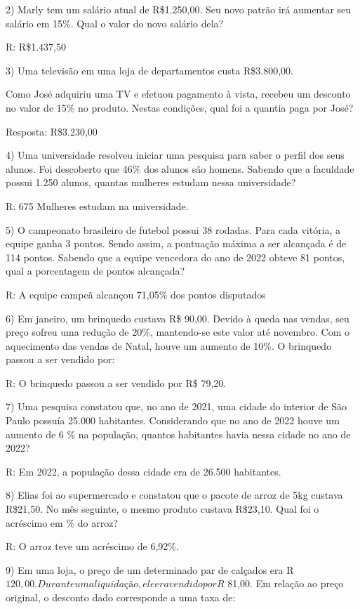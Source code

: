 2) Marly tem um salário atual de R\$1.250,00. Seu novo patrão irá
aumentar seu salário em 15\%. Qual o valor do novo salário dela?

R: R\$1.437,50

3) Uma televisão em uma loja de departamentos custa R\$3.800,00.

Como José adquiriu uma TV e efetuou pagamento à vista, recebeu um
desconto no valor de 15\% no produto. Nestas condições, qual foi a
quantia paga por José?

Resposta: R\$3.230,00

4) Uma universidade resolveu iniciar uma pesquisa para saber o perfil
dos seus alunos. Foi descoberto que 46\% dos alunos são homens. Sabendo
que a faculdade possui 1.250 alunos, quantas mulheres estudam nessa
universidade?

R: 675 Mulheres estudam na universidade.

5) O campeonato brasileiro de futebol possui 38 rodadas. Para cada
vitória, a equipe ganha 3 pontos. Sendo assim, a pontuação máxima a ser
alcançada é de 114 pontos. Sabendo que a equipe vencedora do ano de 2022
obteve 81 pontos, qual a porcentagem de pontos alcançada?

R: A equipe campeã alcançou 71,05\% dos pontos disputados

6) Em janeiro, um brinquedo custava R\$ 90,00. Devido à queda nas
vendas, seu preço sofreu uma redução de 20\%, mantendo-se este valor até
novembro. Com o aquecimento das vendas de Natal, houve um aumento de
10\%. O brinquedo passou a ser vendido por:

R: O brinquedo passou a ser vendido por R\$ 79,20.

7) Uma pesquisa constatou que, no ano de 2021, uma cidade do interior de
São Paulo possuía 25.000 habitantes. Considerando que no ano de 2022
houve um aumento de 6 \% na população, quantos habitantes havia nessa
cidade no ano de 2022?

R: Em 2022, a população dessa cidade era de 26.500 habitantes.

8) Elias foi ao supermercado e constatou que o pacote de arroz de 5kg
custava R\$21,50. No mês seguinte, o mesmo produto custava R\$23,10.
Qual foi o acréscimo em \% do arroz?

R: O arroz teve um acréscimo de 6,92\%.

9) Em uma loja, o preço de um determinado par de calçados era
R\(120,00. Durante uma liquidação, ele era vendido por R\) 81,00. Em
relação ao preço original, o desconto dado corresponde a uma taxa de:

